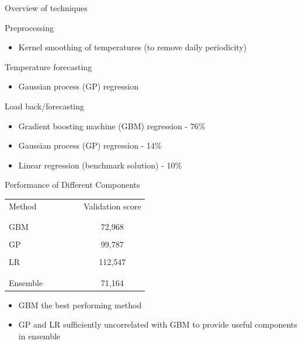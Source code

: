 \begin{frame}{Overview of techniques}
  \begin{block}{Preprocessing}
    \begin{itemize}
      \item Kernel smoothing of temperatures (to remove daily periodicity)
    \end{itemize}
  \end{block}
  \vspace{\baselineskip}
  \begin{block}{Temperature forecasting}
    \begin{itemize}
      \item Gaussian process (GP) regression
    \end{itemize}
  \end{block}
  \vspace{\baselineskip}
  \begin{block}{Load back/forecasting}
    \begin{itemize}
      \item Gradient boosting machine (GBM) regression  - 76\%
      \item Gaussian process (GP) regression - 14\%
      \item Linear regression (benchmark solution) - 10\%
    \end{itemize}
  \end{block}
\end{frame}

\begin{frame}{Performance of Different Components}
  \begin{center}
    \begin{tabular}{lcc|ccc}
      Method &&&&& Validation score\\&&&&&\\
      \hline&&&&&\\
      GBM &&&&& 72,968 \\&&&&&\\
      GP &&&&& 99,787 \\&&&&&\\
      LR &&&&& 112,547 \\&&&&&\\
      \hline&&&&&\\
      Ensemble &&&&& 71,164
    \end{tabular}
  \end{center}
  \begin{itemize}
    \item GBM the best performing method
    \item GP and LR sufficiently uncorrelated with GBM to provide useful components in ensemble
  \end{itemize}
\end{frame}

